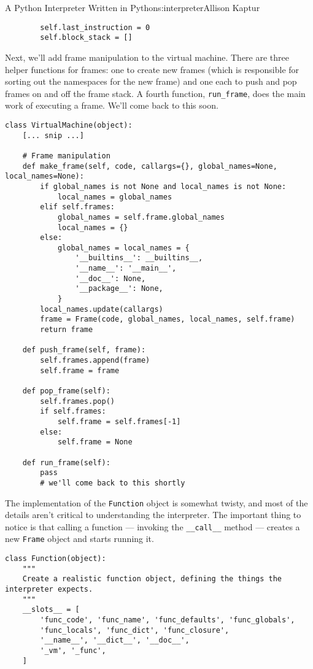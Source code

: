 \begin{aosachapter}{A Python Interpreter Written in Python}{s:interpreter}{Allison Kaptur}
\begin{verbatim}
        self.last_instruction = 0
        self.block_stack = []
\end{verbatim}

Next, we'll add frame manipulation to the virtual machine. There are
three helper functions for frames: one to create new frames (which is
responsible for sorting out the namespaces for the new frame) and one
each to push and pop frames on and off the frame stack. A fourth
function, \texttt{run\_frame}, does the main work of executing a frame.
We'll come back to this soon.

\begin{verbatim}
class VirtualMachine(object):
    [... snip ...]

    # Frame manipulation
    def make_frame(self, code, callargs={}, global_names=None, local_names=None):
        if global_names is not None and local_names is not None:
            local_names = global_names
        elif self.frames:
            global_names = self.frame.global_names
            local_names = {}
        else:
            global_names = local_names = {
                '__builtins__': __builtins__,
                '__name__': '__main__',
                '__doc__': None,
                '__package__': None,
            }
        local_names.update(callargs)
        frame = Frame(code, global_names, local_names, self.frame)
        return frame

    def push_frame(self, frame):
        self.frames.append(frame)
        self.frame = frame

    def pop_frame(self):
        self.frames.pop()
        if self.frames:
            self.frame = self.frames[-1]
        else:
            self.frame = None

    def run_frame(self):
        pass
        # we'll come back to this shortly
\end{verbatim}

\label{the-function-class}

The implementation of the \texttt{Function} object is somewhat twisty,
and most of the details aren't critical to understanding the
interpreter. The important thing to notice is that calling a function
--- invoking the \texttt{\_\_call\_\_} method --- creates a new
\texttt{Frame} object and starts running it.

\begin{verbatim}
class Function(object):
    """
    Create a realistic function object, defining the things the interpreter expects.
    """
    __slots__ = [
        'func_code', 'func_name', 'func_defaults', 'func_globals',
        'func_locals', 'func_dict', 'func_closure',
        '__name__', '__dict__', '__doc__',
        '_vm', '_func',
    ]


\end{verbatim}
\end{aosachapter}
